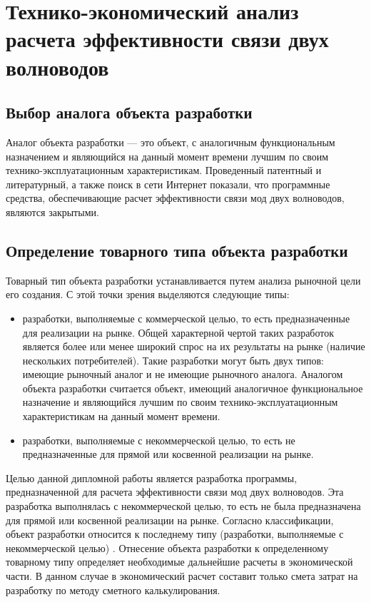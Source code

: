 \chapter{Технико-экономический анализ расчета эффективности связи двух волноводов}
\section{Выбор аналога объекта разработки}
Аналог объекта разработки — это объект, с аналогичным  функциональным назначением и являющийся  на данный момент времени лучшим по своим технико-эксплуатационным характеристикам.
Проведенный патентный и литературный, а также поиск в сети Интернет показали, что программные средства, обеспечивающие расчет эффективности связи мод двух волноводов, являются закрытыми.

\section{Определение товарного типа объекта разработки}
Товарный тип объекта разработки устанавливается путем анализа рыночной цели его создания. С этой точки зрения выделяются следующие типы:
\begin{itemize}
	\item разработки, выполняемые с коммерческой целью, то есть предназначенные для реализации на рынке. Общей характерной чертой  таких разработок является более или менее широкий спрос на их результаты на рынке (наличие нескольких потребителей). Такие разработки могут быть двух типов: имеющие рыночный аналог и не имеющие  рыночного аналога. Аналогом объекта разработки считается объект, имеющий аналогичное функциональное назначение и являющийся лучшим по своим технико-эксплуатационным характеристикам на данный момент времени.
	\item разработки, выполняемые с некоммерческой целью, то есть не предназначенные для прямой или косвенной реализации на рынке.
\end{itemize}
Целью данной дипломной работы является разработка программы, предназначенной для расчета эффективности связи мод двух волноводов. Эта разработка выполнялась с некоммерческой целью, то есть не была предназначена для прямой или косвенной реализации на рынке.
Согласно классификации, объект разработки относится к последнему типу (разработки, выполняемые с некоммерческой целью) \cite{economics}. Отнесение объекта разработки к определенному товарному типу определяет необходимые дальнейшие расчеты в экономической части. В данном случае в экономический расчет составит только смета затрат на разработку по методу сметного калькулирования.

